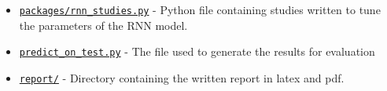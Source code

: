 \begin{itemize}
\item \href{https://github.uio.no/fabior/IN5550/tree/master/Oblig2/rnn_studies.py}{\texttt{packages/rnn\_studies.py}} - Python file containing studies written to tune the parameters of the RNN model.

\item \href{https://github.uio.no/fabior/IN5550/blob/master/Oblig2/predict_on_test.py}{\texttt{predict\_on\_test.py}} - The file used to generate the results for evaluation



\item \href{https://github.uio.no/fabior/IN5550/tree/master/Oblig2/report}{\texttt{report/}} - Directory containing the written report in latex and pdf.

\end{itemize}